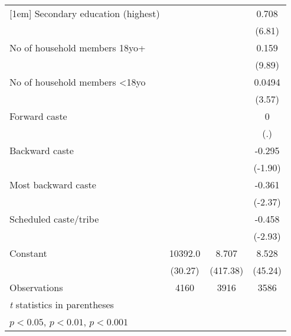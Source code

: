 {\begin{tabular}{l*{3}{c}}
[1em]
Secondary education (highest)&                     &                     &       0.708\sym{***}\\
                    &                     &                     &      (6.81)         \\
[1em]
No of household members 18yo+&                     &                     &       0.159\sym{***}\\
                    &                     &                     &      (9.89)         \\
[1em]
No of household members \textless{}18yo&                     &                     &      0.0494\sym{***}\\
                    &                     &                     &      (3.57)         \\
[1em]
Forward caste       &                     &                     &           0         \\
                    &                     &                     &         (.)         \\
[1em]
Backward caste      &                     &                     &      -0.295         \\
                    &                     &                     &     (-1.90)         \\
[1em]
Most backward caste &                     &                     &      -0.361\sym{*}  \\
                    &                     &                     &     (-2.37)         \\
[1em]
Scheduled caste/tribe&                     &                     &      -0.458\sym{**} \\
                    &                     &                     &     (-2.93)         \\
[1em]
Constant            &     10392.0\sym{***}&       8.707\sym{***}&       8.528\sym{***}\\
                    &     (30.27)         &    (417.38)         &     (45.24)         \\
\hline
Observations        &        4160         &        3916         &        3586         \\
\hline\hline
\multicolumn{4}{l}{\footnotesize \textit{t} statistics in parentheses}\\
\multicolumn{4}{l}{\footnotesize \sym{*} \(p<0.05\), \sym{**} \(p<0.01\), \sym{***} \(p<0.001\)}\\
\end{tabular}
}
